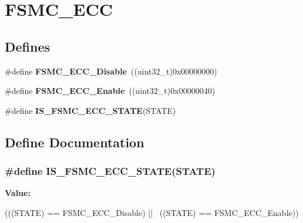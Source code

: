 \hypertarget{group__FSMC__ECC}{
\section{FSMC\_\-ECC}
\label{group__FSMC__ECC}
}
\subsection*{Defines}
\begin{DoxyCompactItemize}
\item 
\hypertarget{group__FSMC__ECC_ga9a3264c0718f5023fd106abea7ef806d}{
\#define {\bfseries FSMC\_\-ECC\_\-Disable}~((uint32\_\-t)0x00000000)}
\label{group__FSMC__ECC_ga9a3264c0718f5023fd106abea7ef806d}

\item 
\hypertarget{group__FSMC__ECC_ga9d940243830695412d4c98228bb5b763}{
\#define {\bfseries FSMC\_\-ECC\_\-Enable}~((uint32\_\-t)0x00000040)}
\label{group__FSMC__ECC_ga9d940243830695412d4c98228bb5b763}

\item 
\#define {\bfseries IS\_\-FSMC\_\-ECC\_\-STATE}(STATE)
\end{DoxyCompactItemize}


\subsection{Define Documentation}
\hypertarget{group__FSMC__ECC_gaf1a7cb45edd8707bf4ea8aac96799c77}{
\subsubsection[{IS\_\-FSMC\_\-ECC\_\-STATE}]{\setlength{\rightskip}{0pt plus 5cm}\#define IS\_\-FSMC\_\-ECC\_\-STATE(STATE)}}
\label{group__FSMC__ECC_gaf1a7cb45edd8707bf4ea8aac96799c77}
{\bfseries Value:}
\begin{DoxyCode}
(((STATE) == FSMC_ECC_Disable) || \
                                  ((STATE) == FSMC_ECC_Enable))
\end{DoxyCode}
